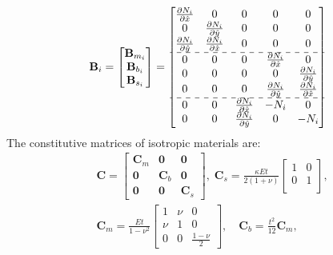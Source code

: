 \documentclass[10pt,letterpaper,journal,final,twoside,twocolumn,nofonttune]{IEEEtran}
\begin{document}
\begin{equation}
\begin{aligned}
\mathbf{B}_{i} =
\begin{bmatrix}
\mathbf{B}_{m_i}\\
\mathbf{B}_{b_i}\\
\mathbf{B}_{s_i}
\end{bmatrix}
=
\begin{bmatrix}
\frac{\partial N_i}{\partial \hat{x}} &0  &0  &0  &0 \\ 
 0& \frac{\partial N_i}{\partial \hat{y}} &0  &0  &0 \\ 
\frac{\partial N_i}{\partial \hat{y}} &\frac{\partial N_i}{\partial \hat{x}}  &0  &0  &0 \\
\hdashline
0 &0  &0  &\frac{\partial N_i}{\partial \hat{x}}  &0 \\ 
0& 0  &0  &0  &\frac{\partial N_i}{\partial \hat{y}} \\ 
0 &0  &0  &\frac{\partial N_i}{\partial \hat{y}}  &\frac{\partial N_i}{\partial \hat{x}} \\
\hdashline
0 &0  &\frac{\partial N_i}{\partial \hat{x}}  &-N_i  &0 \\ 
0& 0  &\frac{\partial N_i}{\partial \hat{y}}  &0  &-N_i 
\end{bmatrix}
\end{aligned}
\end{equation}
The constitutive matrices of isotropic materials are:
\begin{equation}
\begin{aligned}
&\mathbf{C} = \begin{bmatrix}
\mathbf{C}_m&\mathbf{0}&\mathbf{0}\\
\mathbf{0}&\mathbf{C}_b&\mathbf{0}\\
\mathbf{0}&\mathbf{0}&\mathbf{C}_s
\end{bmatrix}, \;
\mathbf{C}_s =\frac{\kappa Et}{2(1+\nu)}
\begin{bmatrix}
1 & 0  \\ 
0 & 1 \\ 
\end{bmatrix}, \\
&
\mathbf{C}_m = \frac{Et}{1-\nu^2}
\begin{bmatrix}
1 & \nu  & 0\\ 
\nu & 1 & 0\\ 
0 & 0 & \frac{1-\nu}{2} 
\end{bmatrix},\quad
\mathbf{C}_b = \frac{t^2}{12} \mathbf{C}_m,
\end{aligned}
\end{equation}
\end{document}
